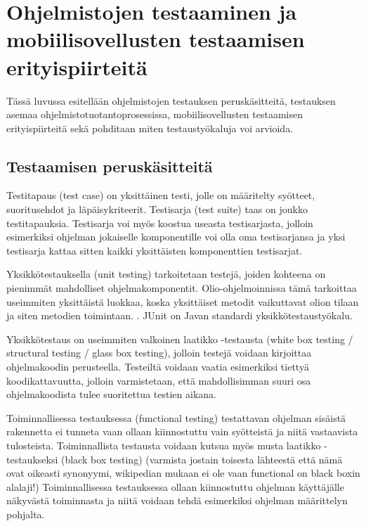 \section{Ohjelmistojen testaaminen ja mobiilisovellusten testaamisen erityispiirteitä}

Tässä luvussa esitellään ohjelmistojen testauksen peruskäsitteitä, testauksen asemaa ohjelmistotuotantoprosessissa, mobiilisovellusten testaamisen erityispiirteitä sekä pohditaan miten testaustyökaluja voi arvioida.

\subsection{Testaamisen peruskäsitteitä}

Testitapaus (test case) on yksittäinen testi, jolle on määritelty syötteet, suoritusehdot ja läpäisykriteerit. Testisarja (test suite) taas on joukko testitapauksia. Testisarja voi myös koostua useasta testisarjasta, jolloin esimerkiksi ohjelman jokaiselle komponentille voi olla oma testisarjansa ja yksi testisarja kattaa sitten kaikki yksittäisten komponenttien testisarjat. \cite[153]{testing}

Yksikkötestauksella (unit testing) tarkoitetaan testejä, joiden kohteena on pienimmät mahdolliset ohjelmakomponentit. Olio-ohjelmoinnissa tämä tarkoittaa useimmiten yksittäistä luokkaa, koska yksittäiset metodit vaikuttavat olion tilaan ja siten metodien toimintaan. \cite[282-286]{testing}. JUnit \cite{junit} on Javan standardi yksikkötestaustyökalu.

Yksikkötestaus on useimmiten valkoinen laatikko -testausta (white box testing / structural testing / glass box testing), jolloin testejä voidaan kirjoittaa ohjelmakoodin perusteella. Testeiltä voidaan vaatia esimerkiksi tiettyä koodikattavuutta, jolloin varmistetaan, että mahdollisimman suuri osa ohjelmakoodista tulee suoritettua testien aikana. \cite[154]{testing}

Toiminnallisessa testauksessa (functional testing) testattavan ohjelman sisäistä rakennetta ei tunneta vaan ollaan kiinnostuttu vain syötteistä ja niitä vastaavista tulosteista. Toiminnallista testausta voidaan kutsua myös musta laatikko -testaukseksi (black box testing) (varmista jostain toisesta lähteestä että nämä ovat oikeasti synonyymi, wikipedian mukaan ei ole vaan functional on black boxin alalaji!) Toiminnallisessa testauksessa ollaan kiinnostuttu ohjelman käyttäjälle näkyvästä toiminnasta ja niitä voidaan tehdä esimerkiksi ohjelman määrittelyn pohjalta. \cite[161-162]{testing}

